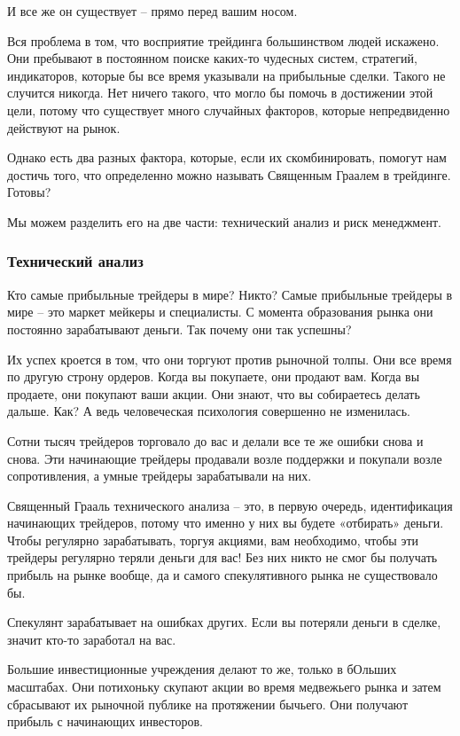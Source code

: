 \documentclass{book}
\begin{document}
И все же он существует – прямо перед вашим носом.

Вся проблема в том, что восприятие трейдинга большинством людей искажено. Они пребывают в постоянном поиске каких-то чудесных систем, стратегий, индикаторов, которые бы все время указывали на прибыльные сделки. Такого не случится никогда. Нет ничего такого, что могло бы помочь в достижении этой цели, потому что существует много случайных факторов, которые непредвиденно действуют на рынок.

Однако есть два разных фактора, которые, если их скомбинировать, помогут нам достичь того, что определенно можно называть Священным Граалем в трейдинге. Готовы?

Мы можем разделить его на две части: технический анализ и риск
менеджмент.

\subsubsection{Технический анализ}

Кто самые прибыльные трейдеры в мире? Никто? Самые прибыльные трейдеры в мире – это маркет мейкеры и специалисты. С момента образования рынка они постоянно зарабатывают деньги. Так почему они так успешны?

Их успех кроется в том, что они торгуют против рыночной толпы. Они все время по другую строну ордеров. Когда вы покупаете, они продают вам. Когда вы продаете, они покупают ваши акции. Они знают, что вы собираетесь делать дальше. Как? А ведь человеческая психология совершенно не изменилась.

Сотни тысяч трейдеров торговало до вас и делали все те же ошибки снова и снова. Эти начинающие трейдеры продавали возле поддержки и покупали возле сопротивления, а умные трейдеры зарабатывали на них.

Священный Грааль технического анализа – это, в первую очередь, идентификация начинающих трейдеров, потому что именно у них вы будете «отбирать» деньги. Чтобы регулярно зарабатывать, торгуя акциями, вам необходимо, чтобы эти трейдеры регулярно теряли деньги для вас! Без них никто не смог бы получать прибыль на рынке вообще, да и самого спекулятивного рынка не существовало бы.

Спекулянт зарабатывает на ошибках других. Если вы потеряли деньги в сделке, значит кто-то заработал на вас.

Большие инвестиционные учреждения делают то же, только в бОльших масштабах. Они потихоньку скупают акции во время медвежьего рынка и затем сбрасывают их рыночной публике на протяжении бычьего. Они получают прибыль с начинающих инвесторов.
\end{document}
